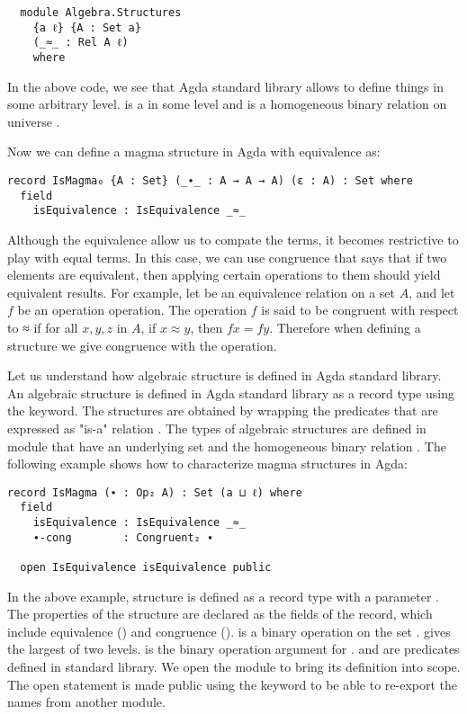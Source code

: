\begin{verbatim}
  module Algebra.Structures
    {a ℓ} {A : Set a} 
    (_≈_ : Rel A ℓ)    
    where
  \end{verbatim} 

In the above code, we see that Agda standard library allows to define things in
some arbitrary level.  is a  in some level  and
 is a homogeneous binary relation  on universe .

Now we can define a magma structure in Agda with equivalence as:

\begin{verbatim}
record IsMagma₀ {A : Set} (_∙_ : A → A → A) (ε : A) : Set where
  field
    isEquivalence : IsEquivalence _≈_
\end{verbatim}

Although the equivalence allow us to compate the terms, it becomes restrictive
to play with equal terms. In this case, we can use congruence  that says that if
two elements are equivalent, then applying certain operations to them should
yield equivalent results. For example, let  be an equivalence relation
on a set $A$, and let $f$ be an operation operation. The operation $f$ is said
to be congruent with respect to ≈ if for all $x, y, z$ in $A$, if $x ≈ y$, then
$f x = f y$. Therefore when defining a structure we give congruence with the
operation.

Let us understand how algebraic structure is defined in Agda standard library.
An algebraic structure is defined in Agda standard library as a record type
using the  keyword. The structures are obtained by wrapping the
predicates that are expressed as "is-a" relation \cite{hu2021formalizing}. The
types of algebraic structures are defined in module 
that have an underlying set  and the homogeneous binary relation
. The following example shows how to characterize magma structures in
Agda:

\begin{verbatim}
record IsMagma (∙ : Op₂ A) : Set (a ⊔ ℓ) where
  field
    isEquivalence : IsEquivalence _≈_
    ∙-cong        : Congruent₂ ∙

  open IsEquivalence isEquivalence public
\end{verbatim}

In the above example, structure  is defined as a record type
with a parameter . The properties of the structure
 are declared as the fields of the record, which include
equivalence () and congruence ().
 is a binary operation on the set .  gives the
largest of two levels.  is the binary operation argument for
.  and  are
predicates defined in standard library. We open the module
 to bring its definition into scope. The open statement is
made public using the keyword  to be able to re-export the names
from another module.

